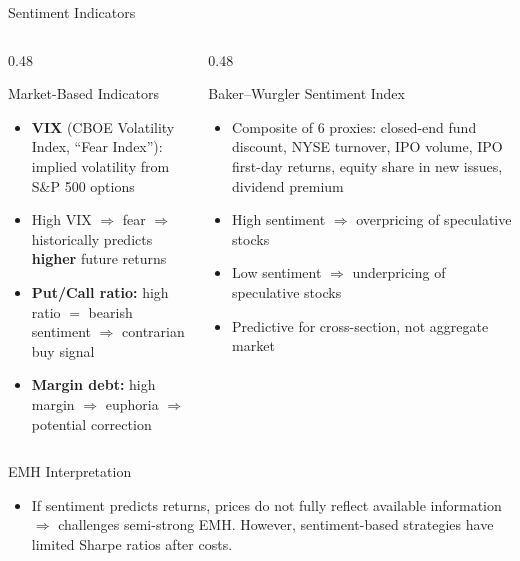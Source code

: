 \documentclass[9pt, aspectratio=169, t]{beamer}
\theoremstyle{definition}
\newenvironment{cminipage}[1]{%
    \par\noindent\hfill\begin{minipage}{#1}\ignorespaces
}{%
    \end{minipage}\hfill\null\par
}
\begin{document}
\begin{frame}{Sentiment Indicators}
\begin{cminipage}{0.95\textwidth}
\footnotesize
\begin{columns}[T]
\begin{column}{0.48\textwidth}
\begin{block}{Market-Based Indicators}
\begin{itemize}\setlength{\itemsep}{0pt}
    \item \textbf{VIX} (CBOE Volatility Index, ``Fear Index''): implied volatility from S\&P 500 options
    \item High VIX $\Rightarrow$ fear $\Rightarrow$ historically predicts \textbf{higher} future returns
    \item \textbf{Put/Call ratio:} high ratio $=$ bearish sentiment $\Rightarrow$ contrarian buy signal
    \item \textbf{Margin debt:} high margin $\Rightarrow$ euphoria $\Rightarrow$ potential correction
\end{itemize}
\end{block}
\end{column}
\begin{column}{0.48\textwidth}
\begin{block}{Baker--Wurgler Sentiment Index}
\begin{itemize}\setlength{\itemsep}{0pt}
    \item Composite of 6 proxies: closed-end fund discount, NYSE turnover, IPO volume, IPO first-day returns, equity share in new issues, dividend premium
    \item High sentiment $\Rightarrow$ overpricing of speculative stocks
    \item Low sentiment $\Rightarrow$ underpricing of speculative stocks
    \item Predictive for cross-section, not aggregate market
\end{itemize}
\end{block}
\end{column}
\end{columns}

\vspace{0.1cm}
\begin{alertblock}{EMH Interpretation}
\begin{itemize}\setlength{\itemsep}{0pt}
    \item If sentiment predicts returns, prices do not fully reflect available information $\Rightarrow$ challenges semi-strong EMH. However, sentiment-based strategies have limited Sharpe ratios after costs.
\end{itemize}
\end{alertblock}
\end{cminipage}
\end{frame}
\end{document}
